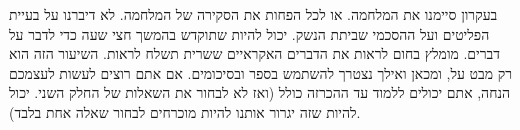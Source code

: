 \documentclass[]{../../../../tex/classes/styledArticle}
\begin{document}
	בעקרון סיימנו את המלחמה. או לכל הפחות את הסקירה של המלחמה. לא דיברנו על בעיית הפליטים ועל ההסכמי שביתת הנשק. יכול להיות שתוקדש בהמשך חצי שעה כדי לדבר על דברים. מומלץ בחום לראות את הדברים האקראיים ששרית תשלח לראות. השיעור הזה הוא רק מבט על, ומכאן ואילך נצטרך להשתמש בספר ובסיכומים. אם אתם רוצים לעשות לעצמכם הנחה, אתם יכולים ללמוד עד ההכרזה כולל (ואז לא לבחור את השאלות של החלק השני. יכול להיות שזה יגרור אותנו להיות מוכרחים לבחור שאלה אחת בלבד). 
	
	
	
	
	
	\ndoc
\end{document}
